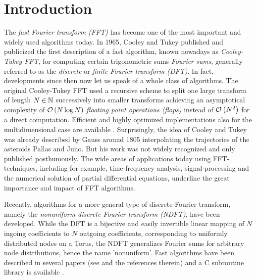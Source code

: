 \chapter{Introduction} \label{Introduction}

The \emph{fast Fourier transform (FFT)} has become one of the most important 
and widely used algorithms today. In 1965, Cooley and Tukey \cite{cotu}
published and publicized the first description of a fast algorithm, known
nowadays as \emph{Cooley-Tukey FFT}, for computing certain trigonometric sums
\emph{Fourier sums},
generally referred to as the  \emph{discrete} or \emph{finite Fourier transform
(DFT)}. In fact, developments since then now let us speak of a whole class of
algorithms. The original Cooley-Tukey FFT used a recursive scheme to split one
large transform of length $N \in \mathbb{N}$ successively into smaller transforms 
achieving an asymptotical
complexity of  $\mathcal{O}\left(N \log N\right)$ \emph{floating point operations (flops)}
instead of $\mathcal{O}\left(N^2\right)$ for a direct computation.  Efficient and highly 
optimized implementations also for the
multidimensional case are available \cite{fftw}. Surprisingly, the idea of
Cooley and Tukey was already described by Gauss around 1805 \cite{HeiJoBu85}
interpolating the trajectories of the asteroids Pallas  and Juno. But his work
was not widely recognized and only published posthumously. The wide areas of
applications today using FFT-techniques, including for example, 
time-frequency analysis, signal-processing and the numerical solution of 
partial differential equations, underline the great importance and impact of
FFT algorithms.

Recently, algorithms for a more general type of discrete Fourier
transform, namely the \emph{nonuniform discrete Fourier transform (NDFT)},
have been developed. 
While the DFT is a bijective and easily invertible linear mapping of $N$ 
ingoing coefficients to $N$ outgoing coefficients, corresponding to uniformly
distributed nodes on a Torus, the NDFT generalizes Fourier sums for
arbitrary node distributions, hence the name 'nonuniform'. Fast algorithms have
been described in several papers  (see \cite{postta01} and the references
therein) and a C subroutine library is available \cite{kupo02C}.

